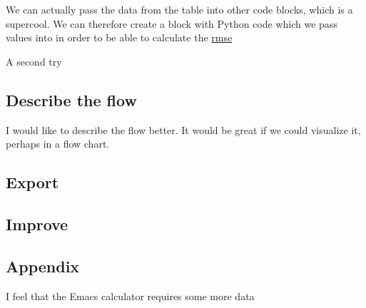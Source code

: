 \documentclass[11pt]{article}
\begin{document}
We can actually pass the data from the table into other code blocks, which is a
supercool. We can therefore create a block with Python code which we pass values
into in order to be able to calculate the \href{https://en.wikipedia.org/wiki/Root-mean-square\_deviation}{rmse}

A second try


\subsection*{Describe the flow}
\label{sec:org7cb3327}

I would like to describe the flow better. It would be great if we could
visualize it, perhaps in a flow chart.





\subsection*{Export}
\label{sec:org4fe90be}
\subsection*{Improve}
\label{sec:orge848216}



\subsection*{Appendix}
\label{sec:org65ccf9d}

I feel that the Emacs calculator requires some more data
\end{document}
